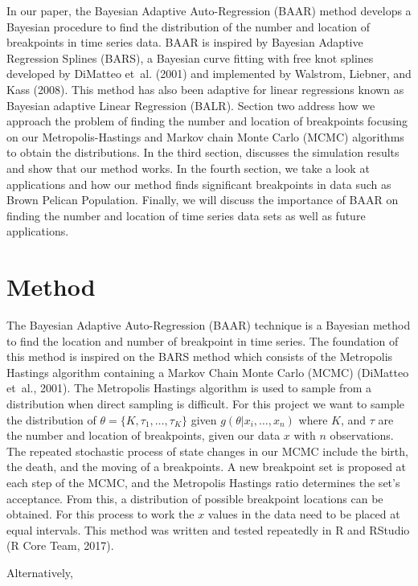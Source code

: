 \documentclass[submit]{smj}
\begin{document}
      In our paper, the Bayesian Adaptive Auto-Regression (BAAR) method develops a Bayesian procedure to find the distribution of the number and location of breakpoints in time series data. BAAR is inspired by Bayesian Adaptive Regression Splines (BARS), a Bayesian curve fitting with free knot splines developed by DiMatteo et~al. (2001) and implemented by Walstrom, Liebner, and Kass (2008). This method has also been adaptive for linear regressions known as Bayesian adaptive Linear Regression (BALR). Section two address how we approach the problem of finding the number and location of breakpoints focusing on our Metropolis-Hastings and Markov chain Monte Carlo (MCMC) algorithms to obtain the distributions. In the third section, discusses the simulation results and show that our method works. In the fourth section, we take a look at applications and how our method finds significant breakpoints in data such as Brown Pelican Population. Finally, we will discuss the importance of BAAR on finding the number and location of time series data sets as well as future applications. 

\section{Method}
The Bayesian Adaptive Auto-Regression (BAAR) technique is a Bayesian method to find the location and number of breakpoint in time series. The foundation of this method is inspired on the BARS method which consists of the Metropolis Hastings algorithm containing a Markov Chain Monte Carlo (MCMC) (DiMatteo et~al., 2001). The Metropolis Hastings algorithm is used to sample from a distribution when direct sampling is difficult. For this project we want to sample the distribution of $\theta = \{K, \tau_1, \dots, \tau_K \}$ given $g(\theta | x_i, \dots , x_n)$ where $K$, and $\tau$ are the number and location of breakpoints, given our data $x$ with $n$ observations. The repeated stochastic process of state changes in our MCMC include the birth, the death, and the moving of a breakpoints. A new breakpoint set is proposed at each step of the MCMC, and the Metropolis Hastings ratio determines the set's acceptance. From this, a distribution of possible breakpoint locations can be obtained. For this process to work the $x$ values in the data need to be placed at equal intervals. This method was written and tested repeatedly in R and RStudio (R Core Team, 2017). 

Alternatively,  
\end{document}
